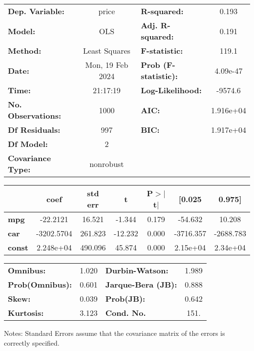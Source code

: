 \begin{center}
\begin{tabular}{lclc}
\toprule
\textbf{Dep. Variable:}    &      price       & \textbf{  R-squared:         } &     0.193   \\
\textbf{Model:}            &       OLS        & \textbf{  Adj. R-squared:    } &     0.191   \\
\textbf{Method:}           &  Least Squares   & \textbf{  F-statistic:       } &     119.1   \\
\textbf{Date:}             & Mon, 19 Feb 2024 & \textbf{  Prob (F-statistic):} &  4.09e-47   \\
\textbf{Time:}             &     21:17:19     & \textbf{  Log-Likelihood:    } &   -9574.6   \\
\textbf{No. Observations:} &        1000      & \textbf{  AIC:               } & 1.916e+04   \\
\textbf{Df Residuals:}     &         997      & \textbf{  BIC:               } & 1.917e+04   \\
\textbf{Df Model:}         &           2      & \textbf{                     } &             \\
\textbf{Covariance Type:}  &    nonrobust     & \textbf{                     } &             \\
\bottomrule
\end{tabular}
\begin{tabular}{lcccccc}
               & \textbf{coef} & \textbf{std err} & \textbf{t} & \textbf{P$> |$t$|$} & \textbf{[0.025} & \textbf{0.975]}  \\
\midrule
\textbf{mpg}   &     -22.2121  &       16.521     &    -1.344  &         0.179        &      -54.632    &       10.208     \\
\textbf{car}   &   -3202.5704  &      261.823     &   -12.232  &         0.000        &    -3716.357    &    -2688.783     \\
\textbf{const} &    2.248e+04  &      490.096     &    45.874  &         0.000        &     2.15e+04    &     2.34e+04     \\
\bottomrule
\end{tabular}
\begin{tabular}{lclc}
\textbf{Omnibus:}       &  1.020 & \textbf{  Durbin-Watson:     } &    1.989  \\
\textbf{Prob(Omnibus):} &  0.601 & \textbf{  Jarque-Bera (JB):  } &    0.888  \\
\textbf{Skew:}          &  0.039 & \textbf{  Prob(JB):          } &    0.642  \\
\textbf{Kurtosis:}      &  3.123 & \textbf{  Cond. No.          } &     151.  \\
\bottomrule
\end{tabular}
\end{center}

Notes: \newline
 [1] Standard Errors assume that the covariance matrix of the errors is correctly specified.